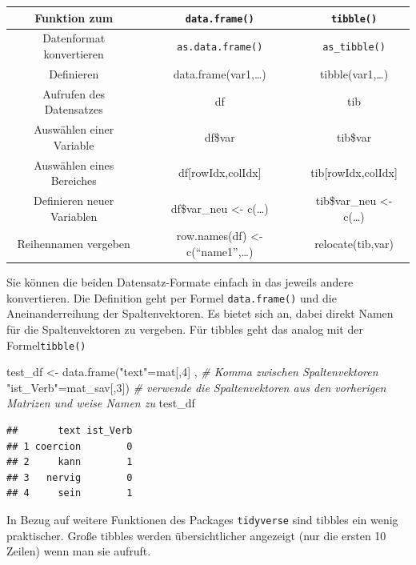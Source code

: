 \documentclass[
]{book}
\newenvironment{Shaded}{\begin{snugshade}}{\end{snugshade}}
\newcommand{\CommentTok}[1]{\textcolor[rgb]{0.56,0.35,0.01}{\textit{#1}}}
\newcommand{\DecValTok}[1]{\textcolor[rgb]{0.00,0.00,0.81}{#1}}
\newcommand{\FunctionTok}[1]{\textcolor[rgb]{0.00,0.00,0.00}{#1}}
\newcommand{\NormalTok}[1]{#1}
\newcommand{\OtherTok}[1]{\textcolor[rgb]{0.56,0.35,0.01}{#1}}
\newcommand{\StringTok}[1]{\textcolor[rgb]{0.31,0.60,0.02}{#1}}
\theoremstyle{definition}
\theoremstyle{definition}
\theoremstyle{definition}
\theoremstyle{definition}
\theoremstyle{remark}
\begin{document}
\begin{longtable}[]{@{}ccc@{}}
\toprule
Funktion zum & \texttt{data.frame()} & \texttt{tibble()} \\
\midrule
\endhead
Datenformat konvertieren & \texttt{as.data.frame()} & \texttt{as\_tibble()} \\
Definieren & data.frame(var1,\ldots) & tibble(var1,\ldots) \\
Aufrufen des Datensatzes & df & tib \\
Auswählen einer Variable & df\$var & tib\$var \\
Auswählen eines Bereiches & df{[}rowIdx,colIdx{]} & tib{[}rowIdx,colIdx{]} \\
Definieren neuer Variablen & df\$var\_neu \textless- c(\ldots) & tib\$var\_neu \textless- c(\ldots) \\
Reihennamen vergeben & row.names(df) \textless-c(``name1'',\ldots) & relocate(tib,var) \\
\bottomrule
\end{longtable}

Sie können die beiden Datensatz-Formate einfach in das jeweils andere konvertieren. Die Definition geht per Formel \texttt{data.frame()} und die Aneinanderreihung der Spaltenvektoren. Es bietet sich an, dabei direkt Namen für die Spaltenvektoren zu vergeben. Für tibbles geht das analog mit der Formel\texttt{tibble()}

\begin{Shaded}
\begin{Highlighting}[]
\NormalTok{test\_df }\OtherTok{\textless{}{-}} \FunctionTok{data.frame}\NormalTok{(}\StringTok{"text"}\OtherTok{=}\NormalTok{mat[,}\DecValTok{4}\NormalTok{] ,         }\CommentTok{\# Komma zwischen Spaltenvektoren}
                      \StringTok{"ist\_Verb"}\OtherTok{=}\NormalTok{mat\_sav[,}\DecValTok{3}\NormalTok{])  }\CommentTok{\# verwende die Spaltenvektoren aus den vorherigen Matrizen und weise Namen zu}
\NormalTok{test\_df}
\end{Highlighting}
\end{Shaded}

\begin{verbatim}
##       text ist_Verb
## 1 coercion        0
## 2     kann        1
## 3   nervig        0
## 4     sein        1
\end{verbatim}

In Bezug auf weitere Funktionen des Packages \texttt{tidyverse} sind tibbles ein wenig praktischer. Große tibbles werden übersichtlicher angezeigt (nur die ersten 10 Zeilen) wenn man sie aufruft.
\end{document}
